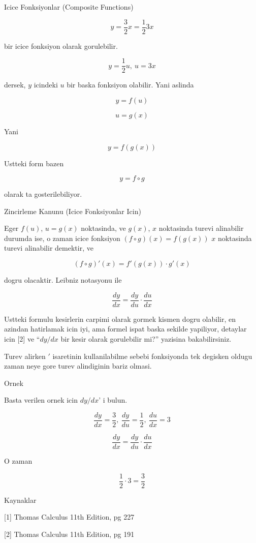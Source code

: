 \documentclass[12pt,fleqn]{article}
\begin{document}
Icice Fonksiyonlar (Composite Functions)

\[ y = \frac{3}{2}x = \frac{1}{2}3x \]

bir icice fonksiyon olarak gorulebilir. 

\[ y = \frac{1}{2}u, \ u=3x \]

dersek, $y$ icindeki $u$ bir baska fonksiyon olabilir. Yani aslinda 

\[ y = f(u) \]

\[ u = g(x) \]

Yani

\[ y = f(g(x)) \]

Ustteki form bazen 

\[ y = f \circ g \]

olarak ta gosterilebiliyor. 

Zincirleme Kanunu (Icice Fonksiyonlar Icin)

Eger $f(u)$, $u=g(x)$ noktasinda, ve $g(x)$, $x$ noktasinda turevi
alinabilir durumda ise, o zaman icice fonksiyon $(f \circ g)(x) = f(g(x))$
$x$ noktasinda turevi alinabilir demektir, ve

\[ (f \circ g)'(x) = f'(g(x)) \cdot g'(x) \]

dogru olacaktir. Leibniz notasyonu ile 

\[ \frac{ dy}{dx} = \frac{ dy}{du} \cdot \frac{ du}{dx} \]

Ustteki formulu kesirlerin carpimi olarak gormek kismen dogru olabilir, en
azindan hatirlamak icin iyi, ama formel ispat baska sekilde yapiliyor,
detaylar icin [2] ve ``$dy/dx$ bir kesir olarak gorulebilir mi?'' yazisina
bakabilirsiniz.

Turev alirken $'$ isaretinin kullanilabilme sebebi fonksiyonda tek degisken
oldugu zaman neye gore turev alindiginin bariz olmasi.

Ornek 

Basta verilen ornek icin $dy/dx$' i bulun. 

\[ \frac{ dy}{dx} = \frac{ 3}{2}, \
\frac{dy}{du} = \frac{ 1}{2}, \
\frac{ du}{dx} = 3
 \]

\[ \frac{ dy}{dx} = \frac{ dy}{du} \cdot \frac{ du}{dx} \]

O zaman 

\[ \frac{ 1}{2} \cdot 3 = \frac{ 3}{2} \]


Kaynaklar 

[1] Thomas Calculus 11th Edition, pg 227

[2] Thomas Calculus 11th Edition, pg 191
\end{document}
